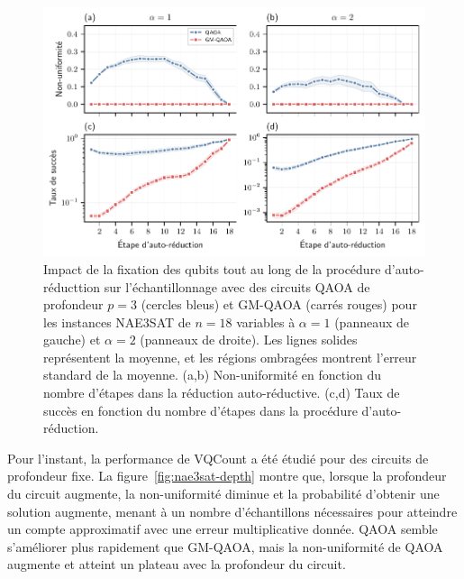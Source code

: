 \begin{figure}[H]
    \centering
    \includegraphics[width=1\textwidth]{figures/nae3sat-self-reduction-step.pdf}
    \caption[Impact de la procédure d'auto-réduction sur la non-uniformité pour \#NAE3SAT]{Impact de la fixation des qubits tout au long de la procédure d'auto-réducttion sur l'échantillonnage avec des circuits QAOA de profondeur $p=3$ (cercles bleus) et GM-QAOA (carrés rouges) pour les instances NAE3SAT de $n=18$ variables à $\alpha=1$ (panneaux de gauche) et $\alpha=2$ (panneaux de droite). Les lignes solides représentent la moyenne, et les régions ombragées montrent l'erreur standard de la moyenne. (a,b) Non-uniformité en fonction du nombre d'étapes dans la réduction auto-réductive. (c,d) Taux de succès en fonction du nombre d'étapes dans la procédure d'auto-réduction.}
    \label{fig:nae3sat-jvv-steps}
\end{figure}

Pour l'instant, la performance de VQCount a été étudié pour des circuits de profondeur fixe. La figure~\ref{fig:nae3sat-depth} montre que, lorsque la profondeur du circuit augmente, la non-uniformité diminue et la probabilité d'obtenir une solution augmente, menant à un nombre d'échantillons nécessaires pour atteindre un compte approximatif avec une erreur multiplicative donnée. QAOA semble s'améliorer plus rapidement que GM-QAOA, mais la non-uniformité de QAOA augmente et atteint un plateau avec la profondeur du circuit.

